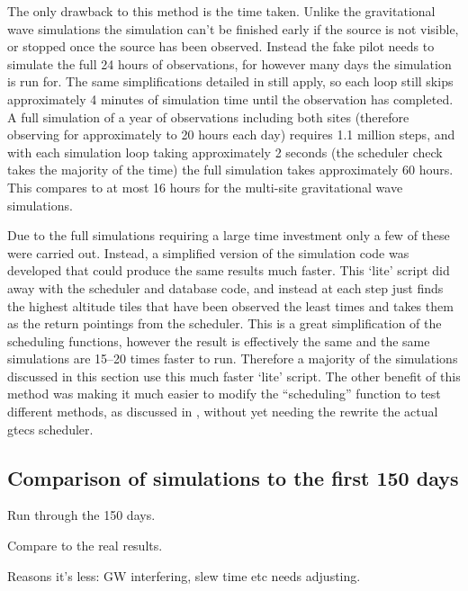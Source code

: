 \begin{colsection}
\begin{colsection}
The only drawback to this method is the time taken. Unlike the gravitational wave simulations the simulation can't be finished early if the source is not visible, or stopped once the source has been observed. Instead the fake pilot needs to simulate the full 24 hours of observations, for however many days the simulation is run for. The same simplifications detailed in  still apply, so each loop still skips approximately 4 minutes of simulation time until the observation has completed. A full simulation of a year of observations including both sites (therefore observing for approximately to 20 hours each day) requires 1.1 million steps, and with each simulation loop taking approximately 2 seconds (the scheduler check takes the majority of the time) the full simulation takes approximately 60 hours. This compares to at most 16 hours for the multi-site gravitational wave simulations.

Due to the full simulations requiring a large time investment only a few of these were carried out. Instead, a simplified version of the simulation code was developed that could produce the same results much faster. This `lite' script did away with the scheduler and database code, and instead at each step just finds the highest altitude tiles that have been observed the least times and takes them as the return pointings from the scheduler. This is a great simplification of the scheduling functions, however the result is effectively the same and the same simulations are 15--20 times faster to run. Therefore a majority of the simulations discussed in this section use this much faster `lite' script. The other benefit of this method was making it much easier to modify the ``scheduling'' function to test different methods, as discussed in , without yet needing the rewrite the actual \gls{gtecs} scheduler.

\end{colsection}


\subsection{Comparison of simulations to the first 150 days}
\label{sec:allsky_sim_existing}
\begin{colsection}

Run through the 150 days.

Compare to the real results.

Reasons it's less: GW interfering, slew time etc needs adjusting.


\end{colsection}
\end{colsection}
